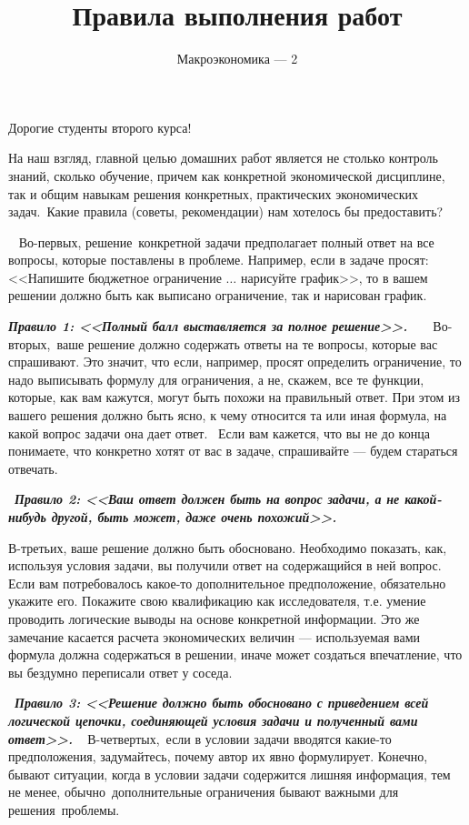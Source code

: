\documentclass[a4paper,12pt]{article}
\author{Макроэкономика --- 2}
\title{Правила выполнения работ}
\date{}
\theoremstyle{plain} %
\theoremstyle{definition} %
\theoremstyle{remark} %
\begin{document}

\maketitle



Дорогие студенты второго курса!


На наш взгляд, главной целью домашних работ является не столько контроль знаний, сколько обучение, причем как конкретной экономической дисциплине, так и общим навыкам решения конкретных, практических экономических задач. Какие правила (советы, рекомендации) нам хотелось бы предоставить?

 
Во-первых, решение конкретной задачи предполагает полный ответ на все вопросы, которые поставлены в проблеме. Например, если в задаче просят: <<Напишите бюджетное ограничение $\dots$ нарисуйте график>>, то в вашем решении должно быть как выписано ограничение, так и нарисован график. 

\textbf{\textit{Правило 1: <<Полный балл выставляется за полное решение>>. 
}}  
 
Во-вторых, ваше решение должно содержать ответы на те вопросы, которые вас спрашивают. Это значит, что если, например, просят определить ограничение, то надо выписывать формулу для ограничения, а не, скажем, все те функции, которые, как вам кажутся, могут быть похожи на правильный ответ. При этом из вашего решения должно быть ясно, к чему относится та или иная формула, на какой вопрос задачи она дает ответ.  Если вам кажется, что вы не до конца понимаете, что конкретно хотят от вас в задаче, спрашивайте --- будем стараться отвечать.

 \textbf{\textit{Правило 2: <<Ваш ответ должен быть на вопрос задачи, а не какой-нибудь другой, быть может, даже очень похожий>>.
}}  


В-третьих, ваше решение должно быть обосновано. Необходимо показать, как, используя условия задачи, вы получили ответ на содержащийся в ней вопрос. Если вам потребовалось какое-то дополнительное предположение, обязательно укажите его.  Покажите свою квалификацию как исследователя, т.е. умение проводить логические выводы на основе конкретной информации. Это же замечание касается расчета экономических величин --- используемая вами формула должна содержаться в решении, иначе может создаться впечатление, что вы бездумно переписали ответ у соседа.

 \textbf{\textit{Правило 3: <<Решение должно быть обосновано с приведением всей логической цепочки, соединяющей условия задачи и полученный вами ответ>>.
}} 
 
В-четвертых, если в условии задачи вводятся какие-то предположения, задумайтесь, почему автор их явно формулирует. Конечно, бывают ситуации, когда в условии задачи содержится лишняя информация, тем не менее, обычно дополнительные ограничения бывают важными для решения проблемы. 
\end{document}

